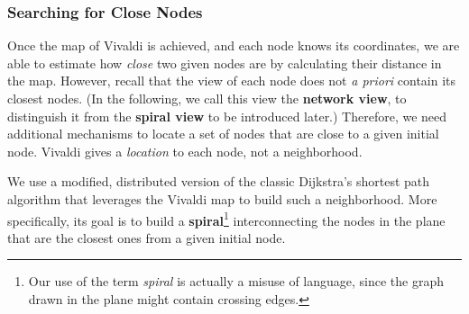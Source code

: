 

\subsubsection*{Searching for Close Nodes}

Once the map of Vivaldi is achieved, and each node knows its coordinates, we are
able to estimate how \emph{close} two given nodes are by calculating their
distance in the map. However, recall that the view of each node does not \emph{a
priori} contain its closest nodes. (In the following, we call this view the {\bf
network view}, to distinguish it from the {\bf spiral view} to be introduced
later.) Therefore, we need additional mechanisms to locate a set of nodes that
are close to a given initial node. Vivaldi gives a \emph{location} to each node,
not a neighborhood. 

We use a modified, distributed version of the classic Dijkstra's shortest path
algorithm that leverages the Vivaldi map to build such a neighborhood. More
specifically, its goal is to build a {\bf spiral}\footnote{Our use of the term
\emph{spiral} is actually a misuse of language, since the graph drawn in the
plane might contain crossing edges.} interconnecting the nodes in the plane that
are the closest ones from a given initial node.

